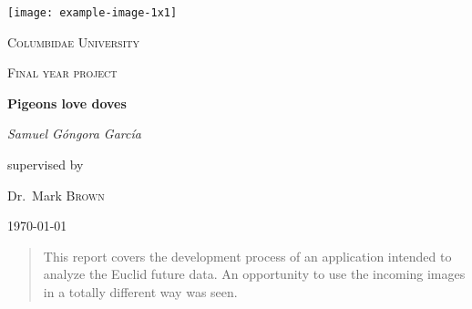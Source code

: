 \documentclass{article}
\begin{document}
\begin{titlepage}
\centering
\texttt{[image: example-image-1x1]}\par\vspace{1cm}
{\scshape\LARGE Columbidae University \par}
\vspace{1cm}
{\scshape\Large Final year project\par}
\vspace{1.5cm}
{\huge\bfseries Pigeons love doves\par}
\vspace{2cm}
{\Large\itshape Samuel Góngora García\par}
\vfill
supervised by\par
Dr.~Mark \textsc{Brown}

\vfill
{\large \today\par}
\end{titlepage}
\newpage\null\thispagestyle{empty}\newpage
\begin{abstract}
This report covers the development process of an application intended to analyze the Euclid future data. An opportunity to use the incoming images in a totally different way was seen.
\end{abstract}
\newpage\null\newpage

\newpage	
\begin{center}
\renewcommand\contentsname{\LARGE{\underline{Index}}}
\tableofcontents
\end{center}
\newpage\null\newpage

\begin{center}
\renewcommand\contentsname{\LARGE{\underline{Figures}}}
\listoffigures
\end{center}
\newpage\null\newpage

\begin{center}
\renewcommand\contentsname{\LARGE{\underline{Tables}}}
\listoftables
\end{center}
\newpage\null\newpage

\end{document}
